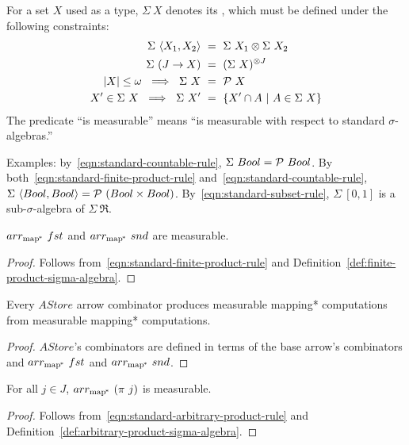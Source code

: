\documentclass[preprint]{sigplanconf}
\newcommand{\arrowarr}{\ensuremath{arr}}
\newcommand{\pmap}{_\mathrm{map^{\mspace{-2mu}*}}}
\newcommand{\arrpmap}{\arrowarr\pmap}
\begin{document}
\begin{definition}
For a set $X$ used as a type, $\Sigma~X$ denotes its , which must be defined under the following constraints:
\begin{align}
	\Sigma~\langle{X_1,X_2}\rangle &\ = \ \Sigma~X_1 \otimes \Sigma~X_2
	\label{eqn:standard-finite-product-rule}
\\
	\Sigma~(J \to X) &\ = \ (\Sigma~X)^{\otimes J}
	\label{eqn:standard-arbitrary-product-rule}
\\
	|X| \le \omega \ \implies \ \Sigma~X &\ =\ \mathcal{P}~X
	\label{eqn:standard-countable-rule}
\\
	X' \in \Sigma~X \ \implies \ \Sigma~X' &\ =\ \lbrace {X' \cap A} \ \lvert\ {A \in \Sigma~X} \rbrace
	\label{eqn:standard-subset-rule}
\end{align}
The predicate ``is measurable'' means ``is measurable with respect to standard $\sigma$-algebras.''
\label{def:standard-sigma-algebra}
\end{definition}
Examples: by~\eqref{eqn:standard-countable-rule}, $\Sigma~Bool = \mathcal{P}~Bool$.
By both~\eqref{eqn:standard-finite-product-rule} and~\eqref{eqn:standard-countable-rule}, $\Sigma~\langle{Bool,Bool}\rangle = \mathcal{P}~(Bool \times Bool)$.
By~\eqref{eqn:standard-subset-rule}, $\Sigma~[0,1]$ is a sub-$\sigma$-algebra of $\Sigma~\Re$.

\begin{theorem}
$\arrpmap~fst$ and $\arrpmap~snd$ are measurable.
\end{theorem}
\begin{proof}
Follows from~\eqref{eqn:standard-finite-product-rule} and Definition~\ref{def:finite-product-sigma-algebra}.
\end{proof}

\begin{theorem}
Every $AStore$ arrow combinator produces measurable mapping* computations from measurable mapping* computations.
\label{thm:astore-measurability-transfer}
\end{theorem}
\begin{proof}
$AStore$'s combinators are defined in terms of the base arrow's combinators and $\arrpmap~fst$ and $\arrpmap~snd$.
\end{proof}

\begin{theorem}
For all $j \in J$, $\arrpmap~(\pi~j)$ is measurable.
\end{theorem}
\begin{proof}
Follows from~\eqref{eqn:standard-arbitrary-product-rule} and Definition~\ref{def:arbitrary-product-sigma-algebra}.
\end{proof}
\end{document}
